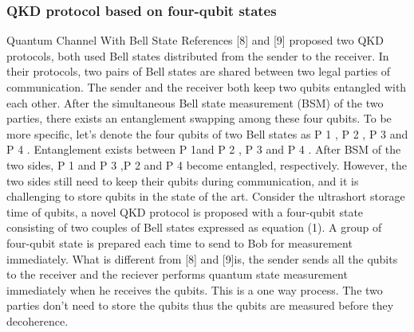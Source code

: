 \subsubsection{QKD protocol based on four-qubit states}

Quantum Channel With Bell State References [8] and [9] proposed two QKD protocols, both used Bell states distributed from the sender to the receiver. In their protocols, two pairs of Bell states are shared between two legal parties of communication. The sender and the receiver both keep two qubits entangled with each other. After the simultaneous Bell state measurement (BSM) of the two parties, there exists an entanglement swapping among these four qubits.
To be more specific, let’s denote the four qubits of two Bell states as P 1 , P 2 , P 3 and P 4 . Entanglement exists between P 1and P 2 , P 3 and P 4 . After BSM of the two sides, P 1 and P 3 ,P 2 and P 4 become entangled, respectively. However, the two sides still need to keep their qubits during communication, and it is challenging to store qubits in the state of the art.
Consider the ultrashort storage time of qubits, a novel QKD protocol is proposed with a four-qubit state consisting of two couples of Bell states expressed as equation (1). A group of four-qubit state is prepared each time to send to Bob for measurement immediately. What is different from [8] and [9]is, the sender sends all the qubits to the receiver and the reciever performs quantum state measurement immediately when he receives the qubits. This is a one way process. The two parties don’t need to store the qubits thus the qubits are measured before they decoherence.

